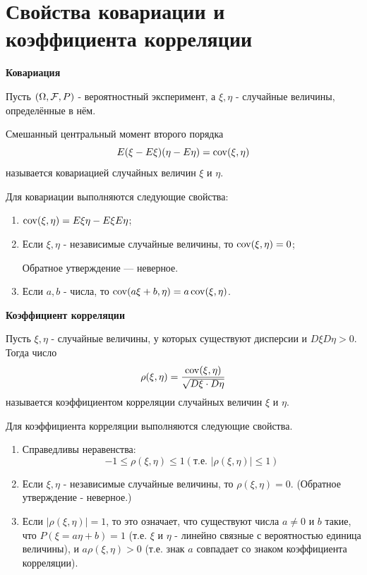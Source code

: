 \section{Свойства ковариации и коэффициента корреляции}

\noindent \textbf{Ковариация}

Пусть $(\Omega, {\mathcal F}, P)$ - вероятностный эксперимент, а $\xi, \eta$ - случайные величины, определённые в нём.

\noindent Смешанный центральный момент второго порядка
\[ E (\xi - E\xi) (\eta - E\eta) = \operatorname{\mathop{cov}} (\xi, \eta) \]
называется ковариацией случайных величин $\xi$ и $\eta$.

Для ковариации выполняются следующие свойства:
\begin{enumerate}
	\item $\operatorname{\mathop{cov}} (\xi, \eta) = E \xi \eta - E \xi E \eta$;
	\item Если $\xi, \eta$ - независимые случайные величины, то $\operatorname{\mathop{cov}} (\xi, \eta) = 0$;
	
	Обратное утверждение — неверное.
	
	\item Если $a, b$ - числа, то $\operatorname{\mathop{cov}} (a \xi + b, \eta) = a \operatorname{\mathop{cov}} (\xi, \eta)$.
\end{enumerate}

\noindent \textbf{Коэффициент корреляции}

Пусть $\xi, \eta$ - случайные величины, у которых существуют дисперсии и $D\xi D\eta > 0$. Тогда число
\[ \rho (\xi, \eta) = \frac{\operatorname{\mathop{cov}} (\xi, \eta)}{\sqrt{D\xi \cdot D\eta}} \]
называется коэффициентом корреляции случайных величин $\xi$ и $\eta$.

Для коэффициента корреляции выполняются следующие свойства.

\begin{enumerate}
	\item Справедливы неравенства:
	\[ -1 \le \rho (\xi, \eta) \le 1 (\text{т.е. } |\rho(\xi, \eta)| \le 1) \]
	\item Если $\xi, \eta$ - независимые случайные величины, то $\rho (\xi, \eta) = 0$. (Обратное утверждение - неверное.)
	\item Если $|\rho(\xi, \eta)| = 1$, то это означает, что существуют числа $a \ne 0$ и $b$ такие, что $P(\xi = a\eta + b) = 1$ (т.е. $\xi$ и $\eta$ - линейно связные с вероятностью единица величины), и $a \rho(\xi, \eta)>0$ (т.е. знак $a$ совпадает со знаком коэффициента корреляции).
\end{enumerate}

